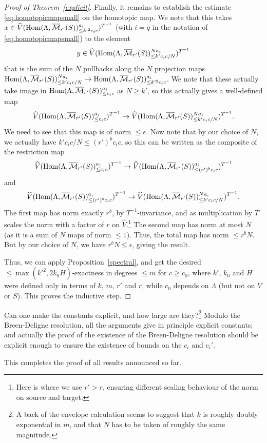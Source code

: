 \begin{proof}[Proof of Theorem~\ref{explicit}]
Finally, it remains to establish the estimate \eqref{eq:homotopicmapsmall} on the homotopic map. We note that this takes $x\in \widehat{V}(\operatorname{Hom}(\Lambda,\overline{\mathcal M}_{r'}(S))_{\leq k'^2c_ic}^{a_i})^{T^{-1}}$ (with $i=q$ in the notation of \eqref{eq:homotopicmapsmall}) to the element
\[
y\in \widehat{V}(\operatorname{Hom}(\Lambda,\overline{\mathcal M}_{r'}(S))_{\leq k'c_ic/N}^{Na_i})^{T^{-1}}
\]
that is the sum of the $N$ pullbacks along the $N$ projection maps $\operatorname{Hom}(\Lambda,\overline{\mathcal M}_{r'}(S))_{\leq k'c_ic/N}^{Na_i}\to \operatorname{Hom}(\Lambda,\overline{\mathcal M}_{r'}(S))_{\leq k'^2c_ic}^{a_i}$. We note that these actually take image in $\operatorname{Hom}(\Lambda,\overline{\mathcal M}_{r'}(S))_{\leq c_ic}^{a_i}$ as $N\geq k'$, so this actually gives a well-defined map
\[
\widehat{V}(\operatorname{Hom}(\Lambda,\overline{\mathcal M}_{r'}(S))_{\leq c_ic}^{a_i})^{T^{-1}}\to \widehat{V}(\operatorname{Hom}(\Lambda,\overline{\mathcal M}_{r'}(S))_{\leq k'c_ic/N}^{Na_i})^{T^{-1}}.
\]
We need to see that this map is of norm $\leq \epsilon$. Now note that by our choice of $N$, we actually have $k'c_ic/N\leq (r')^b c_ic$, so this can be written as the composite of the restriction map
\[
\widehat{V}(\operatorname{Hom}(\Lambda,\overline{\mathcal M}_{r'}(S))_{\leq c_ic}^{a_i})^{T^{-1}}\to \widehat{V}(\operatorname{Hom}(\Lambda,\overline{\mathcal M}_{r'}(S))_{\leq (r')^b c_ic}^{a_i})^{T^{-1}}
\]
and
\[
\widehat{V}(\operatorname{Hom}(\Lambda,\overline{\mathcal M}_{r'}(S))_{\leq (r')^b c_ic}^{a_i})^{T^{-1}}\to \widehat{V}(\operatorname{Hom}(\Lambda,\overline{\mathcal M}_{r'}(S))_{\leq k'c_ic/N}^{Na_i})^{T^{-1}}.
\]
The first map has norm exactly $r^b$, by $T^{-1}$-invariance, and as multiplication by $T$ scales the norm with a factor of $r$ on $\widehat{V}$.\footnote{Here is where we use $r'>r$, ensuring different scaling behaviour of the norm on source and target.} The second map has norm at most $N$ (as it is a sum of $N$ maps of norm $\leq 1$). Thus, the total map has norm $\leq r^bN$. But by our choice of $N$, we have $r^bN\leq \epsilon$, giving the result.

Thus, we can apply Proposition~\ref{spectral}, and get the desired $\leq \max(k'^2,2k_0H)$-exactness in degrees $\leq m$ for $c\geq c_0$, where $k'$, $k_0$ and $H$ were defined only in terms of $k$, $m$, $r'$ and $r$, while $c_0$ depends on $\Lambda$ (but not on $V$ or $S$). This proves the inductive step.
\end{proof}

\begin{question} Can one make the constants explicit, and how large are they?\footnote{A back of the envelope calculation seems to suggest that $k$ is roughly doubly exponential in $m$, and that $N$ has to be taken of roughly the same magnitude.} Modulo the Breen-Deligne resolution, all the arguments give in principle explicit constants; and actually the proof of the existence of the Breen-Deligne resolution should be explicit enough to ensure the existence of bounds on the $c_i$ and $c_i'$.
\end{question}

This completes the proof of all results announced so far.














